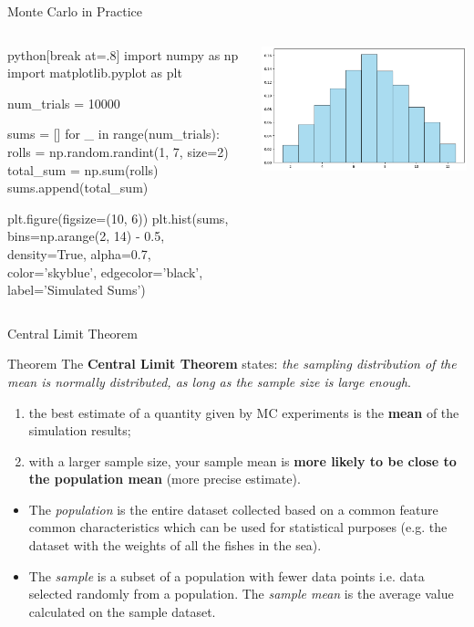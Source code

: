 \documentclass{beamer}
\begin{document}
\begin{frame}[fragile]{Monte Carlo in Practice}
\begin{columns}
\begin{mintedbox}{python}[break at=.8\textheight]
import numpy as np
import matplotlib.pyplot as plt

num_trials = 10000

sums = []
for _ in range(num_trials):
    rolls = np.random.randint(1, 7, size=2)
    total_sum = np.sum(rolls)
    sums.append(total_sum)

plt.figure(figsize=(10, 6))
plt.hist(sums, bins=np.arange(2, 14) - 0.5, density=True, alpha=0.7, 
         color='skyblue', edgecolor='black', label='Simulated Sums')
\end{mintedbox}
    \includegraphics[width=0.8\linewidth]{images/sum_two_dice}
\end{columns}
\end{frame}

\begin{frame}{Central Limit Theorem}
\begin{block}{Theorem}
The \textbf{Central Limit Theorem} states: \emph{the sampling distribution of the mean is normally distributed, as long as the sample size is large enough}.
	
\begin{enumerate}
    \item the best estimate of a quantity given by MC experiments is the \textbf{mean} of the simulation results;
    \item with a larger sample size, your sample mean is \textbf{more likely to be close to the population mean} (more precise estimate).
\end{enumerate}
\end{block}

\begin{itemize}
\item The \emph{population} is the entire dataset collected based on a common feature common characteristics which can be used for statistical purposes (e.g. the dataset with the weights of all the fishes in the sea).
\item The \emph{sample} is a subset of a population with fewer data points i.e. data selected randomly from a population. The \emph{sample mean} is the average value calculated on the sample dataset.
\end{itemize}
\end{frame}
\end{document}
